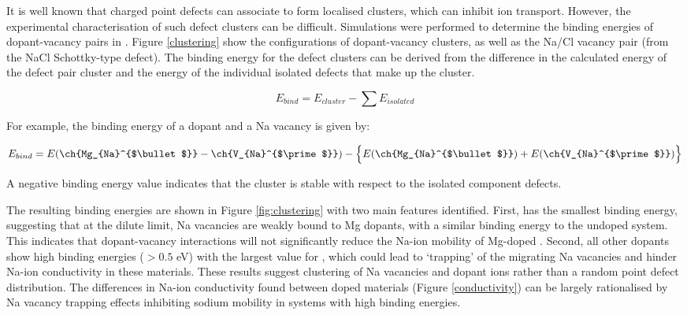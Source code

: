 \documentclass[12pt]{report}
\begin{document}
It is well known that charged point defects can associate to form localised clusters, which can inhibit ion transport. 
However, the experimental characterisation of such defect clusters can be difficult. 
Simulations were performed to determine the binding energies of dopant-vacancy pairs in . 
Figure \ref{clustering} show the configurations of dopant-vacancy clusters, as well as the Na/Cl vacancy pair (from the NaCl Schottky-type defect). 
The binding energy for the defect clusters can be derived from the difference in the calculated energy of the defect pair cluster and the energy of the individual isolated defects that make up the cluster.

\begin{equation}
    E_{bind} = E_{cluster} - \sum E_{isolated}
\end{equation}

\noindent
For example, the binding energy of a  dopant and a Na vacancy is given by:

\begin{equation}
    E_{bind} = E(\ch{Mg_{Na}^{$\bullet$}}-\ch{V_{Na}^{$\prime$}}) - \Big\{ E(\ch{Mg_{Na}^{$\bullet$}}) + E(\ch{V_{Na}^{$\prime$}}) \Big\}
\end{equation}

\noindent
A negative binding energy value indicates that the cluster is stable with respect to the isolated component defects. 

The resulting binding energies are shown in Figure \ref{fig:clustering} with two main features identified. 
First,  has the smallest binding energy, suggesting that at the dilute limit, Na vacancies are weakly bound to Mg dopants, with a similar binding energy to the undoped system. 
This indicates that dopant-vacancy interactions will not significantly reduce the Na-ion mobility of Mg-doped . 
Second, all other dopants show high binding energies ($>0.5$ eV) with the largest value for , which could lead to ‘trapping’ of the migrating Na vacancies and hinder Na-ion conductivity in these materials. 
These results suggest clustering of Na vacancies and dopant ions rather than a random point defect distribution. 
The differences in Na-ion conductivity found between doped materials (Figure \ref{conductivity}) can be largely rationalised by Na vacancy trapping effects inhibiting sodium mobility in systems with high binding energies. 
\end{document}
